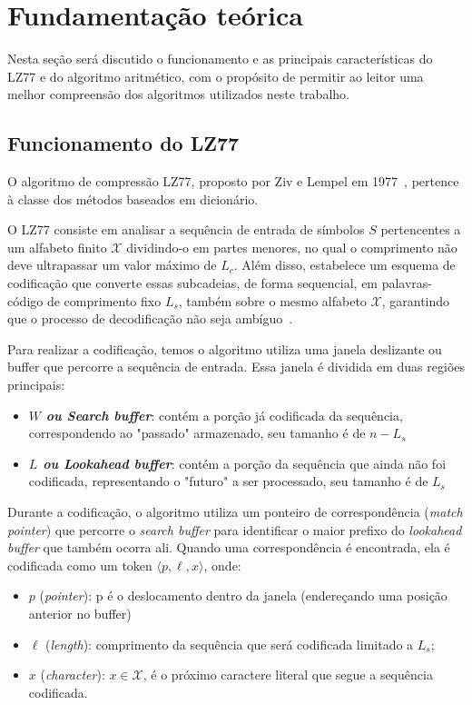 \chapter{Fundamentação teórica}\label{cap:revisao}

Nesta seção será discutido o funcionamento e as principais características do
LZ77 e do algoritmo aritmético, com o propósito de permitir ao leitor uma
melhor compreensão dos algoritmos utilizados neste trabalho.

\section{Funcionamento do LZ77}\label{sec:LZ77}

O algoritmo de compressão LZ77, proposto por Ziv e Lempel em
1977~\cite{1055714}, pertence à classe dos métodos baseados em dicionário.

O LZ77 consiste em analisar a sequência de entrada de símbolos $S$ pertencentes a um alfabeto finito
$\mathcal{X}$ dividindo-o em partes menores, no qual o comprimento não deve ultrapassar
um valor máximo de $L_{c}$. Além disso, estabelece um esquema de codificação que converte essas subcadeias, 
de forma sequencial, em palavras-código de comprimento fixo $L_{s}$, também sobre o mesmo alfabeto $\mathcal{X}$, garantindo que o processo de decodificação não seja ambíguo~\cite{1055714}.

Para realizar a codificação, temos o algoritmo utiliza uma janela deslizante ou buffer que
percorre a sequência de entrada. Essa janela é dividida em duas regiões
principais:

\begin{itemize}
  \item \textbf{\textit{$W$ ou Search buffer}}: contém a porção já codificada da sequência, correspondendo ao "passado" armazenado, seu tamanho é de $n - L_{s}$
  \item \textbf{\textit{$L$ ou Lookahead buffer}}: contém a porção da sequência que ainda não foi codificada, representando o "futuro" a ser processado, seu tamanho é de $L_{s}$
\end{itemize}

Durante a codificação, o algoritmo utiliza um ponteiro de correspondência
(\textit{match pointer}) que percorre o \textit{search buffer} para identificar
o maior prefixo do \textit{lookahead buffer} que também ocorra ali. Quando uma
correspondência é encontrada, ela é codificada como um token $\langle p, \ell,
  x \rangle$, onde:
\begin{itemize}
  \item $p$ (\textit{pointer}): p é o deslocamento dentro da janela (endereçando uma posição anterior no buffer)
  \item $\ell$ (\textit{length}): comprimento da sequência que será codificada limitado a $L_{s}$;
  \item $x$ (\textit{character}): $x \in \mathcal{X}$, é o próximo caractere literal que segue a sequência codificada.
\end{itemize}

